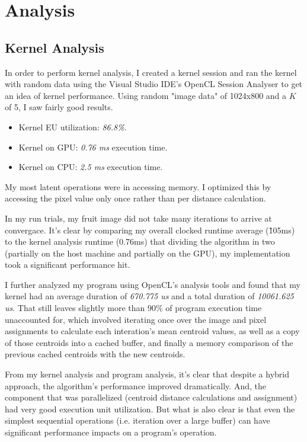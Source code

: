 \documentclass[11pt]{article}
\begin{document}
\section{Analysis}

\subsection{Kernel Analysis}

In order to perform kernel analysis, I created a kernel session and ran the kernel with random
data using the Visual Studio IDE's OpenCL Session Analyser to get an idea of kernel performance.
Using random "image data" of 1024x800 and a $K$ of 5, I saw fairly good results.

\begin{itemize}
\item Kernel EU utilization: \emph{86.8\%}.
\item Kernel on GPU: \emph{0.76 ms} execution time.
\item Kernel on CPU: \emph{2.5 ms} execution time.
\end{itemize}

My most latent operations were in accessing memory. I optimized this by accessing the pixel value
only once rather than per distance calculation.

In my run trials, my fruit image did not take many iterations to arrive at convergace. It's clear
by comparing my overall clocked runtime average (\~105ms) to the kernel analysis runtime (0.76ms)
that dividing the algorithm in two (partially on the host machine and partially on the GPU), my
implementation took a significant performance hit.

I further analyzed my program using OpenCL's analysis tools and found that my kernel had an
average duration of \emph{670.775 us} and a total duration of \emph{10061.625 us}. That still
leaves slightly more than 90\% of program execution time unaccounted for, which involved
iterating once over the image and pixel assignments to calculate each interation's mean centroid
values, as well as a copy of those centroids into a cached buffer, and finally a memory comparison
of the previous cached centroids with the new centroids.

From my kernel analysis and program analysis, it's clear that despite a hybrid approach, the
algorithm's performance improved dramatically. And, the component that was parallelized (centroid
distance calculations and assignment) had very good execution unit utilization. But what is also
clear is that even the simplest sequential operations (i.e. iteration over a large buffer) can have
significant performance impacts on a program's operation.
\end{document}
